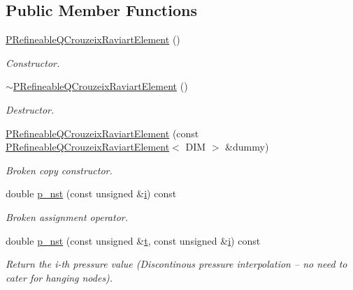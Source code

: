 \subsection*{Public Member Functions}
\begin{DoxyCompactItemize}
\item 
\hyperlink{classoomph_1_1PRefineableQCrouzeixRaviartElement_a969688cb60fec675bb619d09456149e0}{P\+Refineable\+Q\+Crouzeix\+Raviart\+Element} ()
\begin{DoxyCompactList}\small\item\em Constructor. \end{DoxyCompactList}\item 
\hyperlink{classoomph_1_1PRefineableQCrouzeixRaviartElement_a1cf44559e861aa992849c7466d2123e2}{$\sim$\+P\+Refineable\+Q\+Crouzeix\+Raviart\+Element} ()
\begin{DoxyCompactList}\small\item\em Destructor. \end{DoxyCompactList}\item 
\hyperlink{classoomph_1_1PRefineableQCrouzeixRaviartElement_a4b777fda0ed91d4ca0181fb3705b2af3}{P\+Refineable\+Q\+Crouzeix\+Raviart\+Element} (const \hyperlink{classoomph_1_1PRefineableQCrouzeixRaviartElement}{P\+Refineable\+Q\+Crouzeix\+Raviart\+Element}$<$ D\+IM $>$ \&dummy)
\begin{DoxyCompactList}\small\item\em Broken copy constructor. \end{DoxyCompactList}\item 
double \hyperlink{classoomph_1_1PRefineableQCrouzeixRaviartElement_a2a9613cf21e1d115893491423ca5394a}{p\+\_\+nst} (const unsigned \&\hyperlink{cfortran_8h_adb50e893b86b3e55e751a42eab3cba82}{i}) const
\begin{DoxyCompactList}\small\item\em Broken assignment operator. \end{DoxyCompactList}\item 
double \hyperlink{classoomph_1_1PRefineableQCrouzeixRaviartElement_a1a70b2251c5150e4719db4e26bbde7f0}{p\+\_\+nst} (const unsigned \&\hyperlink{cfortran_8h_af6f0bd3dc13317f895c91323c25c2b8f}{t}, const unsigned \&\hyperlink{cfortran_8h_adb50e893b86b3e55e751a42eab3cba82}{i}) const
\begin{DoxyCompactList}\small\item\em Return the i-\/th pressure value (Discontinous pressure interpolation -- no need to cater for hanging nodes). \end{DoxyCompactList}\item 

\end{DoxyCompactItemize}
